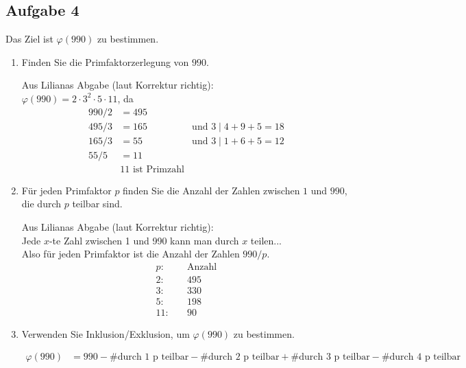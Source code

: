 \documentclass{article} %
\begin{document}
    \subsection*{Aufgabe 4}
    Das Ziel ist $\varphi(990)$ zu bestimmen.
    \begin{enumerate}
        \item[(a)] Finden Sie die Primfaktorzerlegung von $990$.
        \begin{mybox}
        Aus Lilianas Abgabe (laut Korrektur richtig): \\
        $\varphi(990)=2\cdot 3^2\cdot5\cdot11$, da 
        \begin{align*}
            990 / 2 & = 495 & \\
            495 / 3 & =165 & \text{und } 3 \mid 4+9+5=18  \\
            165 / 3 & = 55 & \text{und } 3 \mid 1+6+5=12 \\
            55/5& =11 \\
            & 11 \text{ ist Primzahl} 
        \end{align*}
        \end{mybox}
        \item[(b)] Für jeden Primfaktor $p$ finden Sie die Anzahl der Zahlen zwischen $1$ und $990$, die durch $p$ teilbar sind.
        \begin{mybox}
        Aus Lilianas Abgabe (laut Korrektur richtig): \\
          Jede $x$-te Zahl zwischen 1 und 990 kann man durch $x$ teilen...\\
        Also für jeden Primfaktor ist die Anzahl der Zahlen $990/ p$.
        \begin{align*}
            p :& \quad \text{Anzahl} \\
            2: & \quad 495\\
            3 :&\quad 330 \\
            5 :&\quad 198\\
            11 :& \quad 90
        \end{align*}
        \end{mybox}
        \item[(c)] Verwenden Sie Inklusion/Exklusion, um $\varphi(990)$ zu bestimmen.
        \begin{mybox}
            \begin{align*}
            \varphi(990) & = 990 -  \text{\#durch 1 p teilbar} - \text{\#durch 2 p teilbar} + \text{\#durch 3 p teilbar} - \text{\#durch 4 p teilbar} \\

\end{align*}
\end{mybox}
\end{enumerate}
\end{document}
